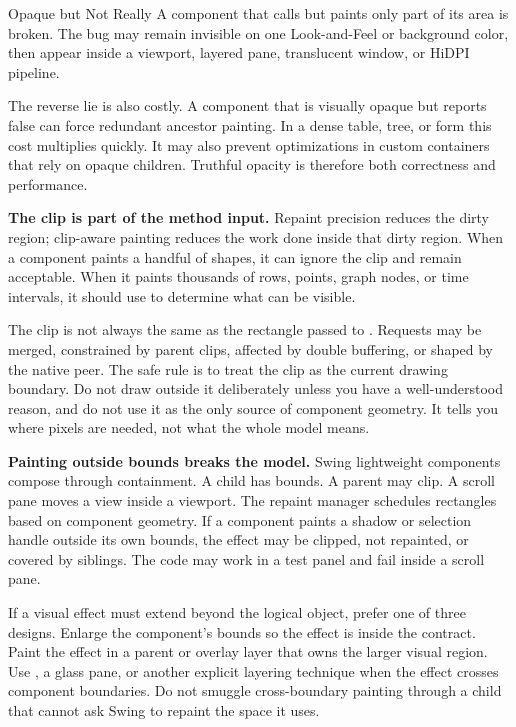 \begin{pitfallbox}{Opaque but Not Really}
A component that calls  but paints only part of its area is broken. The bug may remain invisible on one Look-and-Feel or background color, then appear inside a viewport, layered pane, translucent window, or HiDPI pipeline.
\end{pitfallbox}

The reverse lie is also costly. A component that is visually opaque but reports false can force redundant ancestor painting. In a dense table, tree, or form this cost multiplies quickly. It may also prevent optimizations in custom containers that rely on opaque children. Truthful opacity is therefore both correctness and performance.

\textbf{The clip is part of the method input.} Repaint precision reduces the dirty region; clip-aware painting reduces the work done inside that dirty region. When a component paints a handful of shapes, it can ignore the clip and remain acceptable. When it paints thousands of rows, points, graph nodes, or time intervals, it should use  to determine what can be visible.

The clip is not always the same as the rectangle passed to . Requests may be merged, constrained by parent clips, affected by double buffering, or shaped by the native peer. The safe rule is to treat the clip as the current drawing boundary. Do not draw outside it deliberately unless you have a well-understood reason, and do not use it as the only source of component geometry. It tells you where pixels are needed, not what the whole model means.

\textbf{Painting outside bounds breaks the model.} Swing lightweight components compose through containment. A child has bounds. A parent may clip. A scroll pane moves a view inside a viewport. The repaint manager schedules rectangles based on component geometry. If a component paints a shadow or selection handle outside its own bounds, the effect may be clipped, not repainted, or covered by siblings. The code may work in a test panel and fail inside a scroll pane.

If a visual effect must extend beyond the logical object, prefer one of three designs. Enlarge the component's bounds so the effect is inside the contract. Paint the effect in a parent or overlay layer that owns the larger visual region. Use , a glass pane, or another explicit layering technique when the effect crosses component boundaries. Do not smuggle cross-boundary painting through a child that cannot ask Swing to repaint the space it uses.

